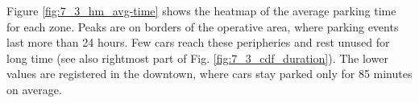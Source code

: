 Figure \ref{fig:7_3_hm_avg-time} shows the heatmap of the average parking time for each zone. Peaks are on borders of the operative area, where parking events last more than 24 hours. Few cars reach these peripheries  and rest unused for long time (see also rightmost part of Fig. \ref{fig:7_3_cdf_duration}). The lower values are registered in the downtown, where cars stay parked only for 85 minutes on average.


%
%
%
%
